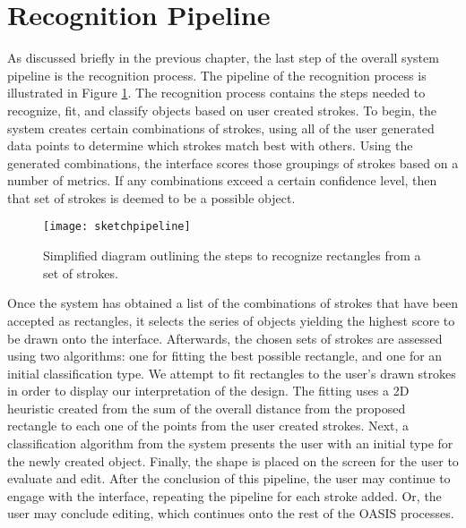 \section{Recognition Pipeline}
\label{sec:recognitionpipeline}
As discussed briefly in the previous chapter, the last step of the overall system pipeline is the recognition process. The pipeline of the recognition process is illustrated in Figure \ref{fig:sketchpipeline}. The recognition process contains the steps needed to recognize, fit, and classify objects based on user created strokes. To begin, the system creates certain combinations of strokes, using all of the user generated data points to determine which strokes match best with others. Using the generated combinations, the interface scores those groupings of strokes based on a number of metrics. If any combinations exceed a certain confidence level, then that set of strokes is deemed to be a possible object. \\

\begin{figure}[ht]
\centering
\texttt{[image: sketchpipeline]}
\caption[Recognition pipeline diagram]{Simplified diagram outlining the steps to recognize rectangles from a set of strokes.}
\label{fig:sketchpipeline}
\end{figure}

Once the system has obtained a list of the combinations of strokes that have been accepted as rectangles, it selects the series of objects yielding the highest score to be drawn onto the interface. Afterwards, the chosen sets of strokes are assessed using two algorithms: one for fitting the best possible rectangle, and one for an initial classification type. We attempt to fit rectangles to the user's drawn strokes in order to display our interpretation of the design. The fitting uses a 2D heuristic created from the sum of the overall distance from the proposed rectangle to each one of the points from the user created strokes. Next, a classification algorithm from the system presents the user with an initial type for the newly created object. Finally, the shape is placed on the screen for the user to evaluate and edit. After the conclusion of this pipeline, the user may continue to engage with the interface, repeating the pipeline for each stroke added. Or, the user may conclude editing, which continues onto the rest of the OASIS processes.


